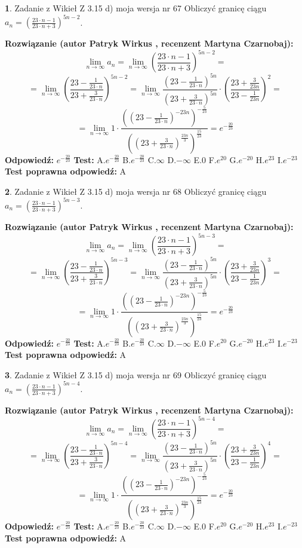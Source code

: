 \documentclass[12pt, a4paper]{article}
\theoremstyle{definition} %
\newtheorem{zad}{}
\newcommand{\zadStart}[1]{\begin{zad}#1\newline}
\newcommand{\zadStop}{\end{zad}}
\newcommand{\rozwStart}[2]{\noindent \textbf{Rozwiązanie (autor #1 , recenzent #2): }\newline}
\newcommand{\rozwStop}{\newline}
\newcommand{\odpStart}{\noindent \textbf{Odpowiedź:}\newline}
\newcommand{\odpStop}{\newline}
\newcommand{\testStart}{\noindent \textbf{Test:}\newline}
\newcommand{\testStop}{\newline}
\newcommand{\kluczStart}{\noindent \textbf{Test poprawna odpowiedź:}\newline}
\newcommand{\kluczStop}{\newline}
\begin{document}
\zadStart{Zadanie z Wikieł Z 3.15 d) moja wersja nr 67}
Obliczyć granicę ciągu $a_{n}=(\frac{23\cdot n - 1}{23 \cdot n + 3})^{5n-2}$.
\zadStop
\rozwStart{Patryk Wirkus}{Martyna Czarnobaj}
$$\lim\limits_{n\to\infty} a_{n} = \lim\limits_{n\to\infty}(\frac{23\cdot n - 1}{23 \cdot n + 3})^{5n-2}=$$
$$=\lim\limits_{n\to\infty}(\frac{23 - \frac{1}{23\cdot n}}{23 + \frac{3}{23 \cdot n}})^{5n-2}=\lim\limits_{n\to\infty}\frac{(23 - \frac{1}{23\cdot n})^{5n}}{(23 + \frac{3}{23\cdot n})^{5n}} \cdot (\frac{23+\frac{3}{23n}}{23-\frac{1}{23n}})^{2}=$$
$$=\lim\limits_{n\to\infty} 1 \cdot \frac{((23-\frac{1}{23 \cdot n})^{-23n})^{-\frac{5}{23}}}{((23+\frac{3}{23 \cdot n})^{\frac{23n}{3}})^{\frac{15}{23}}} =e^{-\frac{20}{23}}$$
\rozwStop
\odpStart
$e^{-\frac{20}{23}}$
\odpStop
\testStart
A.$ e^{-\frac{20}{23}}$
B.$ e^{-\frac{20}{23}}$
C.$\infty$
D.$-\infty$
E.$0$
F.$e^{20}$
G.$e^{-20}$
H.$e^{23}$
I.$e^{-23}$
\testStop
\kluczStart
A
\kluczStop



\zadStart{Zadanie z Wikieł Z 3.15 d) moja wersja nr 68}
Obliczyć granicę ciągu $a_{n}=(\frac{23\cdot n - 1}{23 \cdot n + 3})^{5n-3}$.
\zadStop
\rozwStart{Patryk Wirkus}{Martyna Czarnobaj}
$$\lim\limits_{n\to\infty} a_{n} = \lim\limits_{n\to\infty}(\frac{23\cdot n - 1}{23 \cdot n + 3})^{5n-3}=$$
$$=\lim\limits_{n\to\infty}(\frac{23 - \frac{1}{23\cdot n}}{23 + \frac{3}{23 \cdot n}})^{5n-3}=\lim\limits_{n\to\infty}\frac{(23 - \frac{1}{23\cdot n})^{5n}}{(23 + \frac{3}{23\cdot n})^{5n}} \cdot (\frac{23+\frac{3}{23n}}{23-\frac{1}{23n}})^{3}=$$
$$=\lim\limits_{n\to\infty} 1 \cdot \frac{((23-\frac{1}{23 \cdot n})^{-23n})^{-\frac{5}{23}}}{((23+\frac{3}{23 \cdot n})^{\frac{23n}{3}})^{\frac{15}{23}}} =e^{-\frac{20}{23}}$$
\rozwStop
\odpStart
$e^{-\frac{20}{23}}$
\odpStop
\testStart
A.$ e^{-\frac{20}{23}}$
B.$ e^{-\frac{20}{23}}$
C.$\infty$
D.$-\infty$
E.$0$
F.$e^{20}$
G.$e^{-20}$
H.$e^{23}$
I.$e^{-23}$
\testStop
\kluczStart
A
\kluczStop



\zadStart{Zadanie z Wikieł Z 3.15 d) moja wersja nr 69}
Obliczyć granicę ciągu $a_{n}=(\frac{23\cdot n - 1}{23 \cdot n + 3})^{5n-4}$.
\zadStop
\rozwStart{Patryk Wirkus}{Martyna Czarnobaj}
$$\lim\limits_{n\to\infty} a_{n} = \lim\limits_{n\to\infty}(\frac{23\cdot n - 1}{23 \cdot n + 3})^{5n-4}=$$
$$=\lim\limits_{n\to\infty}(\frac{23 - \frac{1}{23\cdot n}}{23 + \frac{3}{23 \cdot n}})^{5n-4}=\lim\limits_{n\to\infty}\frac{(23 - \frac{1}{23\cdot n})^{5n}}{(23 + \frac{3}{23\cdot n})^{5n}} \cdot (\frac{23+\frac{3}{23n}}{23-\frac{1}{23n}})^{4}=$$
$$=\lim\limits_{n\to\infty} 1 \cdot \frac{((23-\frac{1}{23 \cdot n})^{-23n})^{-\frac{5}{23}}}{((23+\frac{3}{23 \cdot n})^{\frac{23n}{3}})^{\frac{15}{23}}} =e^{-\frac{20}{23}}$$
\rozwStop
\odpStart
$e^{-\frac{20}{23}}$
\odpStop
\testStart
A.$ e^{-\frac{20}{23}}$
B.$ e^{-\frac{20}{23}}$
C.$\infty$
D.$-\infty$
E.$0$
F.$e^{20}$
G.$e^{-20}$
H.$e^{23}$
I.$e^{-23}$
\testStop
\kluczStart
A
\kluczStop
\end{document}
